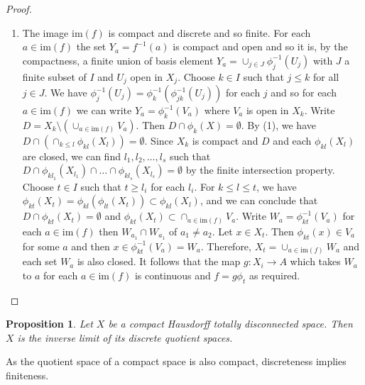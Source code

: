\documentclass[12pt]{report}
\newtheorem{proposition}[theorem]{Proposition}
{\theoremstyle{remark}\newtheorem*{remark}{Remark}}
\theoremstyle{definition}
\newcommand{\im}{\text{im}}
\begin{document}
\begin{proof}
\begin{enumerate}
		\item The image $\im(f)$ is compact and discrete and so finite. For each $a\in \im(f)$ the set $Y_a=f^{-1}(a)$ is compact and open and so it is, by the compactness, a finite union of basis element $Y_a=\cup_{j\in J} \phi_j^{-1}(U_j)$ with $J$ a finite subset of $I$ and $U_j$ open in $X_j$. Choose $k\in I$ such that $j\leq k$ for all $j\in J$. We have $\phi^{-1}_j(U_j)=\phi^{-1}_k(\phi_{jk}^{-1}(U_j))$ for each $j$ and so for each $a\in \im(f)$ we can write $Y_a=\phi_k^{-1}(V_a)$ where $V_a$ is open in $X_k$. Write $D=X_k\setminus (\cup_{a\in \im(f)}V_a)$. Then $D\cap \phi_k(X)=\emptyset$. By (1), we have $D\cap(\cap_{k\leq l} \phi_{kl}(X_l))=\emptyset$. Since $X_k$ is compact and $D$ and each $\phi_{kl}(X_l)$ are closed, we can find $l_1,l_2,\dots,l_s$ such that $D\cap \phi_{kl_1}(X_{l_1})\cap \dots\cap \phi_{kl_s}(X_{l_s})=\emptyset$ by the finite intersection property. Choose $t\in I$ such that $t\geq l_i$ for each $l_i$. For $k\leq l\leq t$, we have $\phi_{kt}(X_t)=\phi_{kl}(\phi_{lt}(X_t))\subset \phi_{kl}(X_l)$, and we can conclude that $D\cap \phi_{kt}(X_t)=\emptyset$ and $\phi_{kt}(X_t)\subset \cap_{a\in \im(f)}V_a$. Write $W_a=\phi_{kt}^{-1}(V_a)$ for each $a\in \im(f)$ then $W_{a_1}\cap W_{a_1}$ of $a_1\not= a_2$. Let $x\in X_t$. Then $\phi_{kt}(x)\in V_a$ for some $a$ and then $x\in \phi_{kt}^{-1}(V_a)=W_a$. Therefore, $X_t=\cup_{a\in \im(f)} W_a$ and each set $W_a$ is also closed. It follows that the map $g:X_i\to A$ which takes $W_a$ to $a$ for each $a\in \im(f)$ is continuous and $f=g\phi_t$ as required.
	\end{enumerate}
\end{proof}

\begin{proposition}\label{27.8}
	Let $X$ be a compact Hausdorff totally disconnected space. Then $X$ is the inverse limit of its discrete quotient spaces.
\end{proposition}

\begin{remark}
	As the quotient space of a compact space is also compact, discreteness implies finiteness.
\end{remark}
\end{document}
